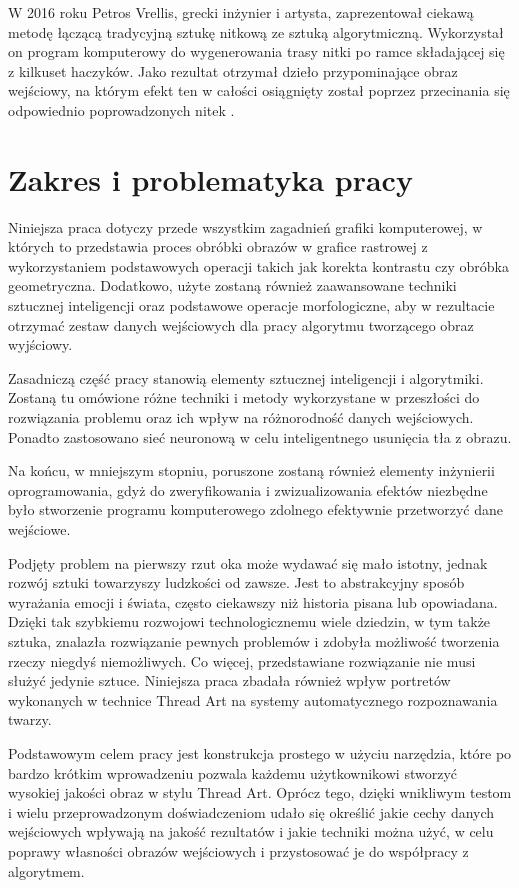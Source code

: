     W 2016 roku Petros Vrellis, grecki inżynier i artysta, zaprezentował ciekawą metodę łączącą tradycyjną sztukę nitkową ze sztuką algorytmiczną. Wykorzystał on program komputerowy do wygenerowania trasy nitki po ramce składającej się z kilkuset haczyków. Jako rezultat otrzymał dzieło przypominające obraz wejściowy, na którym efekt ten w całości osiągnięty został poprzez przecinania się odpowiednio poprowadzonych nitek \cite{new-way-to-knit}.
    
    \section{Zakres i problematyka pracy} \label{intro-scope}
    Niniejsza praca dotyczy przede wszystkim zagadnień grafiki komputerowej, w których to przedstawia proces obróbki obrazów w grafice rastrowej z wykorzystaniem podstawowych operacji takich jak korekta kontrastu czy obróbka geometryczna. Dodatkowo, użyte zostaną również zaawansowane techniki sztucznej inteligencji oraz podstawowe operacje morfologiczne, aby w rezultacie otrzymać zestaw danych wejściowych dla pracy algorytmu tworzącego obraz wyjściowy.
    
    Zasadniczą część pracy stanowią elementy sztucznej inteligencji i algorytmiki. Zostaną tu omówione różne techniki i metody wykorzystane w przeszłości do rozwiązania problemu oraz ich wpływ na różnorodność danych wejściowych. Ponadto zastosowano sieć neuronową w celu inteligentnego usunięcia tła z obrazu.
    
    Na końcu, w mniejszym stopniu, poruszone zostaną również elementy inżynierii oprogramowania, gdyż do zweryfikowania i zwizualizowania efektów niezbędne było stworzenie programu komputerowego zdolnego efektywnie przetworzyć dane wejściowe.
    
    Podjęty problem na pierwszy rzut oka może wydawać się mało istotny, jednak rozwój sztuki towarzyszy ludzkości od zawsze. Jest to abstrakcyjny sposób wyrażania emocji i świata, często ciekawszy niż historia pisana lub opowiadana. Dzięki tak szybkiemu rozwojowi technologicznemu wiele dziedzin, w tym także sztuka, znalazła rozwiązanie pewnych problemów i zdobyła możliwość tworzenia rzeczy niegdyś niemożliwych. Co więcej, przedstawiane rozwiązanie nie musi służyć jedynie sztuce. Niniejsza praca zbadała również wpływ portretów wykonanych w technice Thread Art na systemy automatycznego rozpoznawania twarzy.
    
    Podstawowym celem pracy jest konstrukcja prostego w użyciu narzędzia, które po bardzo krótkim wprowadzeniu pozwala każdemu użytkownikowi stworzyć wysokiej jakości obraz w stylu Thread Art. Oprócz tego, dzięki wnikliwym testom i wielu przeprowadzonym doświadczeniom udało się określić jakie cechy danych wejściowych wpływają na jakość rezultatów i jakie techniki można użyć, w celu poprawy własności obrazów wejściowych i przystosować je do współpracy z algorytmem.
    

